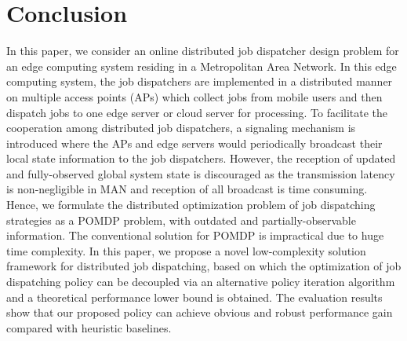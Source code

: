 \section{Conclusion}
\label{sec:conclusion}
In this paper, we consider an online distributed job dispatcher design problem for an edge computing system residing in a Metropolitan Area Network.
In this edge computing system, the job dispatchers are implemented in a distributed manner on multiple access points (APs) which collect jobs from mobile users and then dispatch jobs to one edge server or cloud server for processing.
To facilitate the cooperation among distributed job dispatchers, a signaling mechanism is introduced where the APs and edge servers would periodically broadcast their local state information to the job dispatchers.
However, the reception of updated and fully-observed global system state is discouraged as the transmission latency is non-negligible in MAN and reception of all broadcast is time consuming.
Hence, we formulate the distributed optimization problem of job dispatching strategies as a POMDP problem, with outdated and partially-observable information.
The conventional solution for POMDP is impractical due to huge time complexity.
In this paper, we propose a novel low-complexity solution framework for distributed job dispatching, based on which the optimization of job dispatching policy can be decoupled via an alternative policy iteration algorithm and a theoretical performance lower bound is obtained.
The evaluation results show that our proposed policy can achieve obvious and robust performance gain compared with heuristic baselines.

